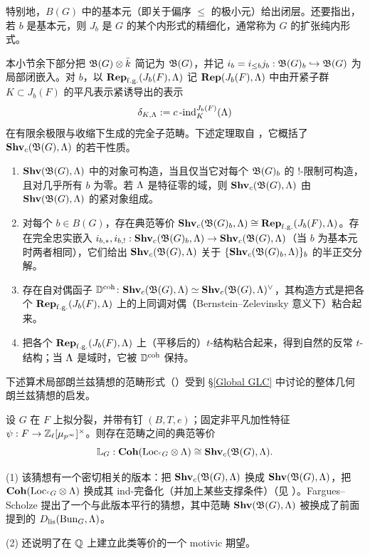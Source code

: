 特别地，$B(G)$ 中的基本元（即关于偏序 $\leq$ 的极小元）给出闭层。还要指出，若 $b$ 是基本元，则 $J_b$ 是 $G$ 的某个内形式的精细化，通常称为 $G$ 的扩张纯内形式。

本小节余下部分把 ${{\mathfrak B}}(G)\otimes \bar k$ 简记为 ${{\mathfrak B}}(G)$，并记 $i_b=i_{\leq b}j_b: {{\mathfrak B}}(G)_b\hookrightarrow {{\mathfrak B}}(G)$ 为局部闭嵌入。对 $b$，以 ${\mathbf{Rep}}_{\operatorname{f.g.}}(J_b(F),{\Lambda})$ 记 ${\mathbf{Rep}}(J_b(F),{\Lambda})$ 中由开紧子群 $K\subset J_b(F)$ 的平凡表示紧诱导出的表示
\[
\delta_{K,{\Lambda}}:=c\operatorname{-ind}_K^{J_b(F)}({\Lambda})
\]
在有限余极限与收缩下生成的完全子范畴。下述定理取自 \cite{Hemo-Zhu-Unipotent}，它概括了 ${\mathbf{Shv}}_c({{\mathfrak B}}(G),{\Lambda})$ 的若干性质。

\begin{thm}\label{T: Local-Langlands-Category}
\begin{enumerate}
    \item ${\mathbf{Shv}}({{\mathfrak B}}(G),{\Lambda})$ 中的对象可构造，当且仅当它对每个 ${\mathfrak B}(G)_b$ 的 $!$-限制可构造，且对几乎所有 $b$ 为零。若 ${\Lambda}$ 是特征零的域，则 ${\mathbf{Shv}}_{c}({\mathfrak B}(G),{\Lambda})$ 由 ${\mathbf{Shv}}({{\mathfrak B}}(G),{\Lambda})$ 的紧对象组成。
    \item 对每个 $b\in B(G)$，存在典范等价 ${\mathbf{Shv}}_c({\mathfrak B}(G)_b,{\Lambda})\cong {\mathbf{Rep}}_{\operatorname{f.g.}}(J_b(F),{\Lambda})$。存在完全忠实嵌入 $i_{b,*}, i_{b,!}:  {\mathbf{Shv}}_c({\mathfrak B}(G)_b,{\Lambda})\to {\mathbf{Shv}}_c({{\mathfrak B}}(G),{\Lambda})$（当 $b$ 为基本元时两者相同），它们给出 ${\mathbf{Shv}}_c({\mathfrak B}(G),{\Lambda})$ 关于 $\{{\mathbf{Shv}}_c({\mathfrak B}(G)_b,{\Lambda})\}_b$ 的半正交分解。
    \item 存在自对偶函子 ${\mathbb D}^{{\operatorname{coh}}}\colon {\mathbf{Shv}}_c({\mathfrak B}(G),{\Lambda})\simeq {\mathbf{Shv}}_c({\mathfrak B}(G),{\Lambda})^{\vee}$，其构造方式是把各个 ${\mathbf{Rep}}_{\operatorname{f.g.}}(J_b(F),{\Lambda})$ 上的上同调对偶（Bernstein--Zelevinsky 意义下）粘合起来。
    \item 把各个 ${\mathbf{Rep}}_{\operatorname{f.g.}}(J_b(F),{\Lambda})$ 上（平移后的）$t$-结构粘合起来，得到自然的反常 $t$-结构；当 ${\Lambda}$ 是域时，它被 ${\mathbb D}^{{\operatorname{coh}}}$ 保持。
\end{enumerate}
\end{thm}

下述算术局部朗兰兹猜想的范畴形式（\cite[Sect. 4.6]{Zhu-Conjecture}）受到 \S\ref{Global GLC} 中讨论的整体几何朗兰兹猜想的启发。

\begin{conj}\label{C: LLC}
设 $G$ 在 $F$ 上拟分裂，并带有钉 $(B,T,e)$；固定非平凡加性特征 $\psi: F\to {\mathbb Z}_\ell[\mu_{p^\infty}]^\times$。则存在范畴之间的典范等价
\[
{\mathbb L}_{G}:   {\mathbf{Coh}}({\operatorname{Loc}}_{{}^cG}\otimes{\Lambda})\cong {\mathbf{Shv}}_{c}({\mathfrak B}(G),{\Lambda}).
\]
\end{conj}

\begin{rmk}
(1) 该猜想有一个密切相关的版本：把 ${\mathbf{Shv}}_{c}({\mathfrak B}(G),{\Lambda})$ 换成 ${\mathbf{Shv}}({\mathfrak B}(G),{\Lambda})$，把 ${\mathbf{Coh}}({\operatorname{Loc}}_{{}^cG}\otimes{\Lambda})$ 换成其 ind-完备化（并加上某些支撑条件）（见 \cite[Sect. 4.6]{Zhu-Conjecture}）。Fargues--Scholze \cite{Fargues-Scholze-Geometrization} 提出了一个与此版本平行的猜想，其中范畴 ${\mathbf{Shv}}({\mathfrak B}(G),{\Lambda})$ 被换成了前面提到的 $D_{\operatorname{lis}}({\operatorname{Bun}}_G,{\Lambda})$。

(2) \cite{Zhu-Conjecture} 还说明了在 ${\mathbb Q}$ 上建立此类等价的一个 motivic 期望。
\end{rmk}

